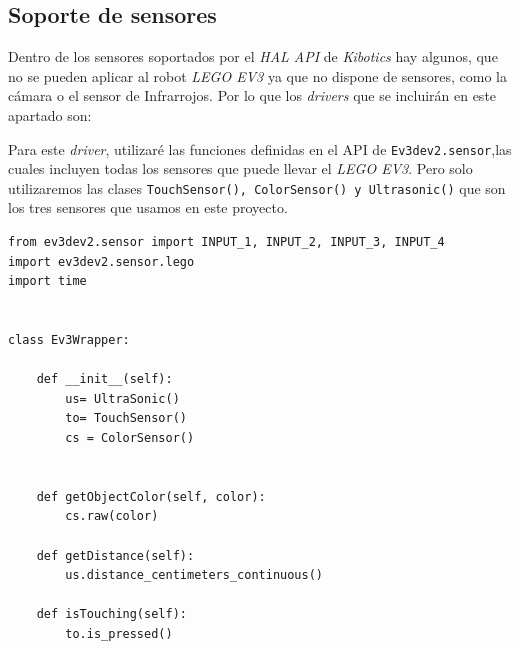 \subsection{Soporte de sensores}
Dentro de los sensores soportados por el \textit{HAL API} de \textit{Kibotics} hay algunos, que no se pueden aplicar al robot \textit{LEGO EV3} ya que no dispone de sensores, como la cámara o el sensor de Infrarrojos. Por lo que los \textit{drivers} que se incluirán en este apartado son:

\begin{table}[H]
\caption{Métodos (HAL API) soportados por Ev3.}
\vspace{0.5cm}
\label{tab:tablaSensores}
\end{table}

Para este \textit{driver}, utilizaré las funciones definidas en el API de \texttt{Ev3dev2.sensor},las cuales incluyen todas los sensores que puede llevar el \textit{LEGO EV3}. Pero solo utilizaremos las clases \texttt{TouchSensor(), ColorSensor() y Ultrasonic()} que son los tres sensores que usamos en este proyecto. 

\begin{lstlisting}[frame=single,breaklines=true, label=Driver Actuadores, caption=Drivers,  captionpos=b]
from ev3dev2.sensor import INPUT_1, INPUT_2, INPUT_3, INPUT_4
import ev3dev2.sensor.lego
import time


class Ev3Wrapper:

    def __init__(self):
        us= UltraSonic()
        to= TouchSensor()
        cs = ColorSensor()


    def getObjectColor(self, color):
        cs.raw(color)

    def getDistance(self):
        us.distance_centimeters_continuous()

    def isTouching(self):
        to.is_pressed()
\end{lstlisting}


